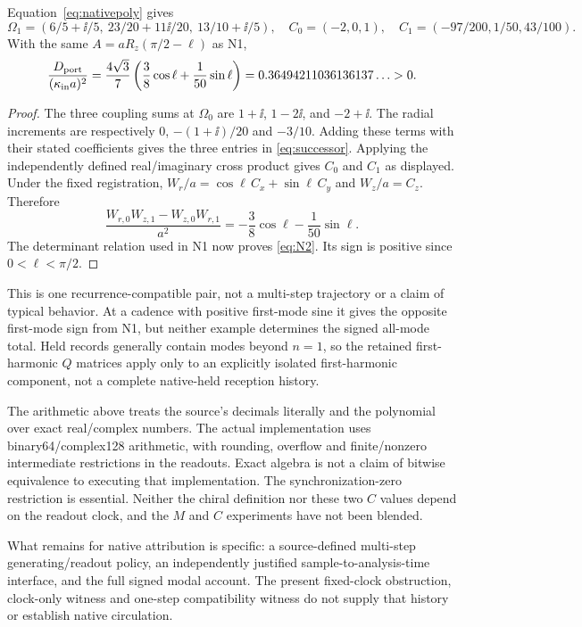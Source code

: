 \begin{proposition}\label{prop:N2}
Equation~\eqref{eq:nativepoly} gives
\begin{equation}\label{eq:successor}
 \Omega_1=(6/5+\ii/5,\ 23/20+11\ii/20,\ 13/10+\ii/5),
 \quad C_0=(-2,0,1),\quad C_1=(-97/200,1/50,43/100).
\end{equation}
With the same $A=aR_z(\pi/2-\ell)$ as N1,
\begin{equation}\label{eq:N2}
 \frac{D_{\rm port}}{(\kappa_{\rm in}a)^2}
 =\frac{4\sqrt3}{7}\left(\frac38\cos\ell+\frac1{50}\sin\ell\right)
 =0.36494211036136137\ldots>0.
\end{equation}
\end{proposition}
\begin{proof}
The three coupling sums at $\Omega_0$ are $1+\ii$, $1-2\ii$, and $-2+\ii$. The radial increments are respectively $0$, $-(1+\ii)/20$ and $-3/10$. Adding these terms with their stated coefficients gives the three entries in \eqref{eq:successor}. Applying the independently defined real/imaginary cross product gives $C_0$ and $C_1$ as displayed. Under the fixed registration,
$W_r/a=\cos\ell\,C_x+\sin\ell\,C_y$ and $W_z/a=C_z$. Therefore
\[
 \frac{W_{r,0}W_{z,1}-W_{z,0}W_{r,1}}{a^2}
 =-\frac38\cos\ell-\frac1{50}\sin\ell.
\]
The determinant relation used in N1 now proves \eqref{eq:N2}. Its sign is positive since $0<\ell<\pi/2$.
\end{proof}

This is one recurrence-compatible pair, not a multi-step trajectory or a claim of typical behavior. At a cadence with positive first-mode sine it gives the opposite first-mode sign from N1, but neither example determines the signed all-mode total. Held records generally contain modes beyond $n=1$, so the retained first-harmonic $Q$ matrices apply only to an explicitly isolated first-harmonic component, not a complete native-held reception history.

The arithmetic above treats the source's decimals literally and the polynomial over exact real/complex numbers. The actual implementation uses binary64/complex128 arithmetic, with rounding, overflow and finite/nonzero intermediate restrictions in the readouts. Exact algebra is not a claim of bitwise equivalence to executing that implementation. The synchronization-zero restriction is essential. Neither the chiral definition nor these two $C$ values depend on the readout clock, and the $M$ and $C$ experiments have not been blended.

What remains for native attribution is specific: a source-defined multi-step generating/readout policy, an independently justified sample-to-analysis-time interface, and the full signed modal account. The present fixed-clock obstruction, clock-only witness and one-step compatibility witness do not supply that history or establish native circulation.
